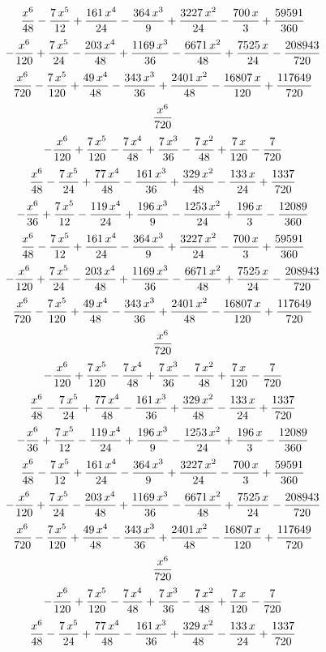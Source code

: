 $${{x^6}\over{48}}-{{7\,x^5}\over{12}}+{{161\,x^4}\over{24}}-{{364\,x
 ^3}\over{9}}+{{3227\,x^2}\over{24}}-{{700\,x}\over{3}}+{{59591
 }\over{360}}$$
$$-{{x^6}\over{120}}+{{7\,x^5}\over{24}}-{{203\,x^4}\over{48}}+{{1169
 \,x^3}\over{36}}-{{6671\,x^2}\over{48}}+{{7525\,x}\over{24}}-{{
 208943}\over{720}}$$
$${{x^6}\over{720}}-{{7\,x^5}\over{120}}+{{49\,x^4}\over{48}}-{{343\,
 x^3}\over{36}}+{{2401\,x^2}\over{48}}-{{16807\,x}\over{120}}+{{
 117649}\over{720}}$$
$${{x^6}\over{720}}$$
$$-{{x^6}\over{120}}+{{7\,x^5}\over{120}}-{{7\,x^4}\over{48}}+{{7\,x^
 3}\over{36}}-{{7\,x^2}\over{48}}+{{7\,x}\over{120}}-{{7}\over{720}}$$
$${{x^6}\over{48}}-{{7\,x^5}\over{24}}+{{77\,x^4}\over{48}}-{{161\,x^
 3}\over{36}}+{{329\,x^2}\over{48}}-{{133\,x}\over{24}}+{{1337}\over{
 720}}$$
$$-{{x^6}\over{36}}+{{7\,x^5}\over{12}}-{{119\,x^4}\over{24}}+{{196\,
 x^3}\over{9}}-{{1253\,x^2}\over{24}}+{{196\,x}\over{3}}-{{12089
 }\over{360}}$$
$${{x^6}\over{48}}-{{7\,x^5}\over{12}}+{{161\,x^4}\over{24}}-{{364\,x
 ^3}\over{9}}+{{3227\,x^2}\over{24}}-{{700\,x}\over{3}}+{{59591
 }\over{360}}$$
$$-{{x^6}\over{120}}+{{7\,x^5}\over{24}}-{{203\,x^4}\over{48}}+{{1169
 \,x^3}\over{36}}-{{6671\,x^2}\over{48}}+{{7525\,x}\over{24}}-{{
 208943}\over{720}}$$
$${{x^6}\over{720}}-{{7\,x^5}\over{120}}+{{49\,x^4}\over{48}}-{{343\,
 x^3}\over{36}}+{{2401\,x^2}\over{48}}-{{16807\,x}\over{120}}+{{
 117649}\over{720}}$$
$${{x^6}\over{720}}$$
$$-{{x^6}\over{120}}+{{7\,x^5}\over{120}}-{{7\,x^4}\over{48}}+{{7\,x^
 3}\over{36}}-{{7\,x^2}\over{48}}+{{7\,x}\over{120}}-{{7}\over{720}}$$
$${{x^6}\over{48}}-{{7\,x^5}\over{24}}+{{77\,x^4}\over{48}}-{{161\,x^
 3}\over{36}}+{{329\,x^2}\over{48}}-{{133\,x}\over{24}}+{{1337}\over{
 720}}$$
$$-{{x^6}\over{36}}+{{7\,x^5}\over{12}}-{{119\,x^4}\over{24}}+{{196\,
 x^3}\over{9}}-{{1253\,x^2}\over{24}}+{{196\,x}\over{3}}-{{12089
 }\over{360}}$$
$${{x^6}\over{48}}-{{7\,x^5}\over{12}}+{{161\,x^4}\over{24}}-{{364\,x
 ^3}\over{9}}+{{3227\,x^2}\over{24}}-{{700\,x}\over{3}}+{{59591
 }\over{360}}$$
$$-{{x^6}\over{120}}+{{7\,x^5}\over{24}}-{{203\,x^4}\over{48}}+{{1169
 \,x^3}\over{36}}-{{6671\,x^2}\over{48}}+{{7525\,x}\over{24}}-{{
 208943}\over{720}}$$
$${{x^6}\over{720}}-{{7\,x^5}\over{120}}+{{49\,x^4}\over{48}}-{{343\,
 x^3}\over{36}}+{{2401\,x^2}\over{48}}-{{16807\,x}\over{120}}+{{
 117649}\over{720}}$$
$${{x^6}\over{720}}$$
$$-{{x^6}\over{120}}+{{7\,x^5}\over{120}}-{{7\,x^4}\over{48}}+{{7\,x^
 3}\over{36}}-{{7\,x^2}\over{48}}+{{7\,x}\over{120}}-{{7}\over{720}}$$
$${{x^6}\over{48}}-{{7\,x^5}\over{24}}+{{77\,x^4}\over{48}}-{{161\,x^
 3}\over{36}}+{{329\,x^2}\over{48}}-{{133\,x}\over{24}}+{{1337}\over{
 720}}$$
